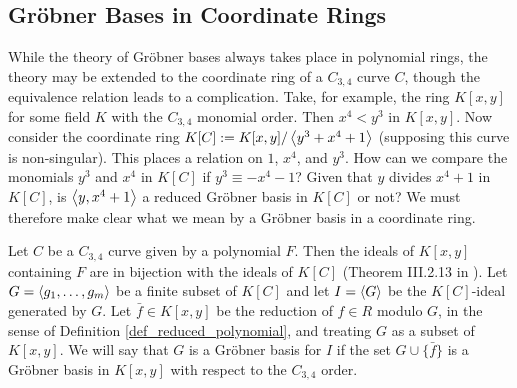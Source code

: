 \subsection{Gr\"obner Bases in Coordinate Rings}
\label{sec_groebner_bases_in_coordinate_rings}

While the theory of Gr\"obner bases always takes place in polynomial rings,
the theory may be extended to the coordinate ring of a $C_{3,4}$ curve $C$,
though the equivalence relation leads to a complication.
Take, for example, the ring $K[x,y]$ for some field $K$ with the $C_{3,4}$ monomial order.
Then $x^4 < y^3$ in $K[x,y]$.
Now consider the coordinate ring $K[C] := K[x,y]/\left\langle y^3 + x^4 + 1 \right\rangle$
(supposing this curve is non-singular).
This places a relation on $1$, $x^4$, and $y^3$.
How can we compare the monomials $y^3$ and $x^4$ in $K[C]$ if $y^3 \equiv -x^4 - 1$?
Given that $y$ divides $x^4 + 1$ in $K[C]$, is $\left\langle y, x^4 + 1 \right\rangle$ a reduced Gr\"obner basis in $K[C]$ or not?
We must therefore make clear what we mean by a Gr\"obner basis in a coordinate ring.

Let $C$ be a $C_{3,4}$ curve given by a polynomial $F$.
Then the ideals of $K[x,y]$ containing $F$ are in bijection with the ideals of $K[C]$
(Theorem III.2.13 in \cite{hungerford}).
Let $G = \left\langle g_1, \ldots, g_m \right\rangle$ be a finite subset of $K[C]$
and let $I = \left\langle G \right\rangle$ be the $K[C]$-ideal generated by $G$.
Let $\bar f \in K[x,y]$ be the reduction of $f \in R$ modulo $G$,
in the sense of Definition \ref{def_reduced_polynomial},
and treating $G$ as a subset of $K[x,y]$.
We will say that $G$ is a Gr\"obner basis for $I$
if the set $G \cup \{ \bar f \}$ is a Gr\"obner basis in $K[x,y]$ with respect to the $C_{3,4}$ order.

